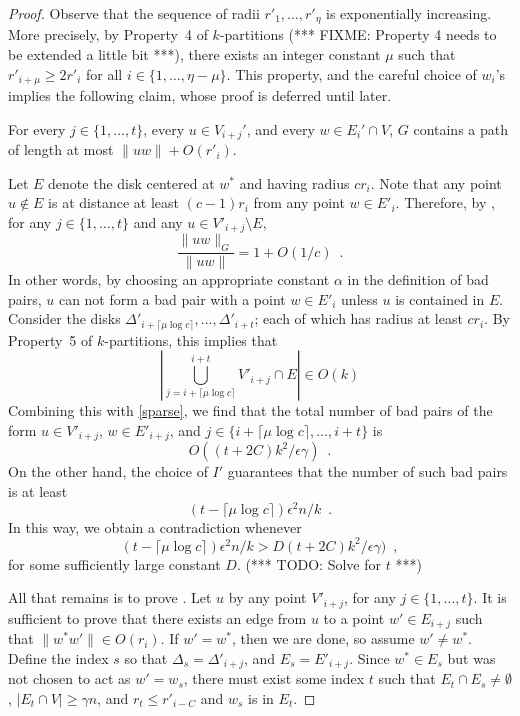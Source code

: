 \documentclass{patmorin}
\begin{document}
\begin{proof}
  Observe that the sequence of radii $r'_1,\ldots,r'_{\eta}$
  is exponentially increasing.  More precisely, by Property~4 of
  $k$-partitions (*** FIXME: Property 4 needs to be extended a little bit ***),
  there exists an integer constant $\mu$ such that $r'_{i+\mu} \ge 2r'_i$
  for all $i\in\{1,\ldots,\eta-\mu\}$.  This property, and the careful
  choice of $w_i$'s implies the following claim, whose proof is deferred
  until later.
  \begin{clm}
    For every $j\in\{1,\ldots,t\}$, every $u\in V_{i+j}'$, and every $w\in
    E_i'\cap V$, $G$ contains a path of length at most $\|uw\|+O(r'_i)$.
  \end{clm}

  Let $E$ denote the disk centered at $w^*$ and having radius $cr_i$.
  Note that any point $u\not\in E$ is at distance at least $(c-1)r_i$
  from any point $w\in E'_i$.  Therefore, by , for any
  $j\in\{1,\ldots,t\}$ and any $u\in V'_{i+j}\setminus E$,
  \[  
     \frac{\|uw\|_G}{\|uw\|} = 1+O(1/c) \enspace . 
  \]
  In other words, by choosing an appropriate constant $\alpha$ in the
  definition of bad pairs, $u$ can not form a bad pair with a point
  $w\in E'_i$ unless $u$ is contained in $E$.  Consider the disks
  $\Delta'_{i+\lceil\mu\log c\rceil},\ldots,\Delta'_{i+t}$; each of
  which has radius at least $cr_i$.  By Property~5 of $k$-partitions,
  this implies that
  \[
    \left|\bigcup_{j=i+\lceil\mu\log c\rceil}^{i+t} V'_{i+j}\cap E\right|
      \in O(k)
  \]
  Combining this with \eqref{sparse}, we find that the total number
  of bad pairs of the form $u\in V'_{i+j}$, $w\in E'_{i+j}$, and
  $j\in\{i+\lceil\mu\log c\rceil,\ldots,i+t\}$ is
  \[
     O((t+2C)k^2/\epsilon\gamma) \enspace .
  \]
  On the other hand, the choice of $I'$ guarantees that the number of
  such bad pairs is at least 
  \[
     (t-\lceil\mu\log c\rceil)\epsilon^2n/k \enspace .
  \]
  In this way, we obtain a contradiction whenever 
  \[
     (t-\lceil\mu\log c\rceil)\epsilon^2n/k > D(t+2C)k^2/\epsilon\gamma) \enspace ,
  \]
  for some sufficiently large constant $D$.  (*** TODO: Solve for $t$ ***)

  All that remains is to prove .  Let $u$ by any point
  $V'_{i+j}$, for any $j\in\{1,\ldots,t\}$.  It is sufficient to prove
  that there exists an edge from $u$ to a point $w'\in E_{i+j}$ such
  that $\|w^*w'\|\in O(r_i)$.   If $w'=w^*$, then we are done, so assume
  $w'\neq w^*$.  Define the index $s$ so that $\Delta_s=\Delta'_{i+j}$,
  and $E_s=E'_{i+j}$.  Since $w^*\in E_s$ but was not chosen to act as $w'=w_s$,
  there must exist some index $t$ such that $E_t\cap E_s\neq\emptyset$,
  $|E_t\cap V|\ge\gamma n$, and $r_t \le r'_{i-C}$ and $w_s$ is in $E_t$.


\end{proof}
\end{document}
